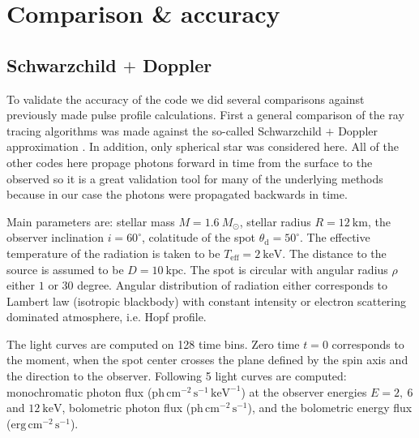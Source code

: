 \documentclass[iop, usenatbib]{emulateapj}
\newcommand{\Msun}{\ensuremath{M_{\odot}}}
\begin{document}
\section{Comparison \& accuracy}

\subsection{Schwarzchild $+$ Doppler}

To validate the accuracy of the code we did several comparisons against previously made pulse profile calculations.
First a general comparison of the ray tracing algorithms was made against the so-called Schwarzchild $+$ Doppler approximation \citep[see e.g.][]{PB06}.
In addition, only spherical star was considered here.
All of the other codes here propage photons forward in time from the surface to the observed so it is a great validation tool for many of the underlying methods because in our case the photons were propagated backwards in time.

Main parameters are: stellar mass $M = 1.6~\Msun$, stellar radius $R = 12~\mathrm{km}$, the observer inclination $i = 60^{\circ}$, colatitude of the spot $\theta_{\mathrm{d}} = 50^{\circ}$.
The effective temperature of the radiation is taken to be $T_{\mathrm{eff}} = 2~\mathrm{keV}$. 
The distance to the source is assumed to be $D = 10~\mathrm{kpc}$.
The spot is circular with angular radius $\rho$ either $1$ or $30$ degree.
Angular distribution of radiation either corresponds to Lambert law (isotropic blackbody) with constant intensity or electron scattering dominated atmosphere, i.e. Hopf profile.

The light curves are computed on 128 time bins.
Zero time $t = 0$ corresponds to the moment, when the spot center crosses the plane defined by the spin axis and the direction to the observer.
Following 5 light curves are computed: monochromatic photon flux ($\mathrm{ph}\,\mathrm{cm}^{-2}\,\mathrm{s}^{-1}\,\mathrm{keV}^{-1}$) at the observer energies $E = 2,~6$ and $12~\mathrm{keV}$, bolometric photon flux ($\mathrm{ph}\,\mathrm{cm}^{-2}\,\mathrm{s}^{-1}$), and the bolometric energy flux ($\mathrm{erg}\,\mathrm{cm}^{-2}\,\mathrm{s}^{-1}$).
\end{document}
